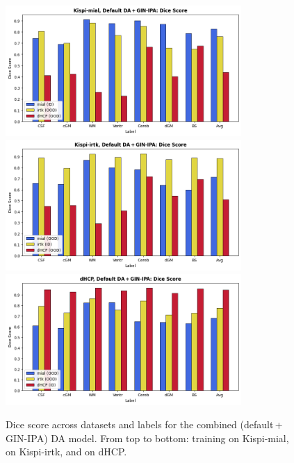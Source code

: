 \begin{figure}[htbp]
    \centering
    \includegraphics[width=0.8\textwidth]{figures/mial_both_DC.png}\\
    \vspace{10pt}
    \includegraphics[width=0.8\textwidth]{figures/irtk_both_DC.png}\\
    \vspace{10pt}
    \includegraphics[width=0.8\textwidth]{figures/dHCP_both_DC.png}
    \caption{Dice score across datasets and labels for the combined (default\,+\,GIN-IPA) DA model. From top to bottom: training on Kispi-mial, on Kispi-irtk, and on dHCP.}
    \label{fig:both_DC}
\end{figure}
